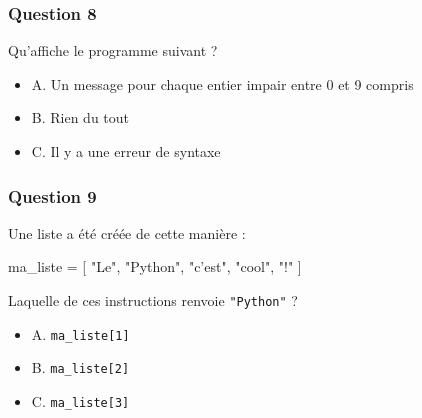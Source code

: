 \documentclass[
]{article}
\newenvironment{Shaded}{}{}
\newcommand{\BuiltInTok}[1]{#1}
\newcommand{\ControlFlowTok}[1]{\textcolor[rgb]{0.00,0.44,0.13}{\textbf{#1}}}
\newcommand{\DecValTok}[1]{\textcolor[rgb]{0.25,0.63,0.44}{#1}}
\newcommand{\KeywordTok}[1]{\textcolor[rgb]{0.00,0.44,0.13}{\textbf{#1}}}
\newcommand{\NormalTok}[1]{#1}
\newcommand{\OperatorTok}[1]{\textcolor[rgb]{0.40,0.40,0.40}{#1}}
\newcommand{\StringTok}[1]{\textcolor[rgb]{0.25,0.44,0.63}{#1}}
\providecommand{\tightlist}{%
  \setlength{\itemsep}{0pt}\setlength{\parskip}{0pt}}
\begin{document}
\hypertarget{question-8}{%
\subsubsection{Question 8}\label{question-8}}

Qu'affiche le programme suivant ?

\begin{Shaded}
\end{Shaded}

\begin{itemize}
\tightlist
\item
  A. Un message pour chaque entier impair entre 0 et 9 compris
\item
  B. Rien du tout
\item
  C. Il y a une erreur de syntaxe
\end{itemize}

\hypertarget{question-9}{%
\subsubsection{Question 9}\label{question-9}}

Une liste a été créée de cette manière :

\begin{Shaded}
\begin{Highlighting}[]
\NormalTok{ma_liste }\OperatorTok{=}\NormalTok{ [ }\StringTok{"Le"}\NormalTok{, }\StringTok{"Python"}\NormalTok{, }\StringTok{"c'est"}\NormalTok{, }\StringTok{"cool"}\NormalTok{, }\StringTok{"!"}\NormalTok{ ]}
\end{Highlighting}
\end{Shaded}

Laquelle de ces instructions renvoie \texttt{"Python"} ?

\begin{itemize}
\tightlist
\item
  A. \texttt{ma\_liste{[}1{]}}
\item
  B. \texttt{ma\_liste{[}2{]}}
\item
  C. \texttt{ma\_liste{[}3{]}}
\end{itemize}
\end{document}
